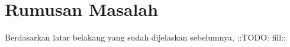 \section{Rumusan Masalah}

Berdasarkan latar belakang yang sudah dijelaskan sebelumnya, ::TODO: fill::
